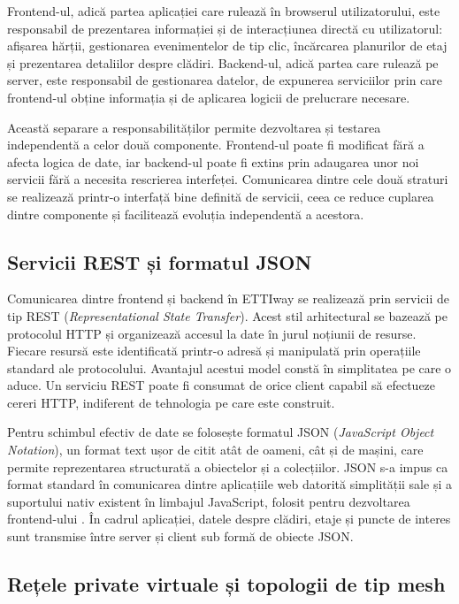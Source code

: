 Frontend-ul, adică partea aplicației care rulează în browserul utilizatorului,
este responsabil de prezentarea informației și de interacțiunea directă cu
utilizatorul: afișarea hărții, gestionarea evenimentelor de tip clic, încărcarea
planurilor de etaj și prezentarea detaliilor despre clădiri. Backend-ul, adică
partea care rulează pe server, este responsabil de gestionarea datelor, de
expunerea serviciilor prin care frontend-ul obține informația și de aplicarea
logicii de prelucrare necesare.

Această separare a responsabilităților permite dezvoltarea și testarea
independentă a celor două componente. Frontend-ul poate fi modificat fără a
afecta logica de date, iar backend-ul poate fi extins prin adaugarea unor noi servicii fără a
necesita rescrierea interfeței. Comunicarea dintre cele două straturi se
realizează printr-o interfață bine definită de servicii, ceea ce reduce
cuplarea dintre componente și facilitează evoluția independentă a acestora.

\subsection{Servicii REST și formatul JSON}
\label{subsec:rest-json}

Comunicarea dintre frontend și backend în ETTIway se realizează prin servicii de
tip REST (\textit{Representational State Transfer}). Acest stil arhitectural se
bazează pe protocolul HTTP și organizează accesul la date în jurul noțiunii de
resurse. Fiecare resursă este identificată printr-o adresă și manipulată prin
operațiile standard ale protocolului. Avantajul acestui model constă în
simplitatea pe care o aduce. Un serviciu REST poate fi
consumat de orice client capabil să efectueze cereri HTTP, indiferent de
tehnologia pe care este construit.

Pentru schimbul efectiv de date se folosește formatul JSON (\textit{JavaScript
Object Notation}), un format text ușor de citit atât de oameni, cât și de
mașini, care permite reprezentarea structurată a obiectelor și a colecțiilor.
JSON s-a impus ca format standard în comunicarea dintre aplicațiile web datorită
simplității sale și a suportului nativ existent în limbajul JavaScript, folosit
pentru dezvoltarea frontend-ului \cite{JSONorg}. În cadrul aplicației, datele despre clădiri,
etaje și puncte de interes sunt transmise între server și client sub formă de
obiecte JSON.

\subsection{Rețele private virtuale și topologii de tip mesh}
\label{subsec:mesh}
 
